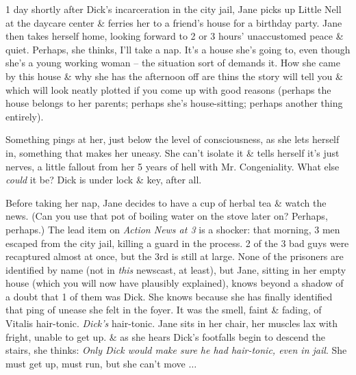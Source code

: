 \documentclass{article}
\numberwithin{equation}{section}
\begin{document}
1 day shortly after Dick's incarceration in the city jail, Jane picks up Little Nell at the daycare center \& ferries her to a friend's house for a birthday party. Jane then takes herself home, looking forward to 2 or 3 hours' unaccustomed peace \& quiet. Perhaps, she thinks, I'll take a nap. It's a house she's going to, even though she's a young working woman -- the situation sort of demands it. How she came by this house \& why she has the afternoon off are thins the story will tell you \& which will look neatly plotted if you come up with good reasons (perhaps the house belongs to her parents; perhaps she's house-sitting; perhaps another thing entirely).

Something pings at her, just below the level of consciousness, as she lets herself in, something that makes her uneasy. She can't isolate it \& tells herself it's just nerves, a little fallout from her 5 years of hell with Mr. Congeniality. What else \textit{could} it be? Dick is under lock \& key, after all.

Before taking her nap, Jane decides to have a cup of herbal tea \& watch the news. (Can you use that pot of boiling water on the stove later on? Perhaps, perhaps.) The lead item on \textit{Action News at 3} is a shocker: that morning, 3 men escaped from the city jail, killing a guard in the process. 2 of the 3 bad guys were recaptured almost at once, but the 3rd is still at large. None of the prisoners are identified by name (not in \textit{this} newscast, at least), but Jane, sitting in her empty house (which you will now have plausibly explained), knows beyond a shadow of a doubt that 1 of them was Dick. She knows because she has finally identified that ping of unease she felt in the foyer. It was the smell, faint \& fading, of Vitalis hair-tonic. \textit{Dick's} hair-tonic. Jane sits in her chair, her muscles lax with fright, unable to get up. \& as she hears Dick's footfalls begin to descend the stairs, she thinks: \textit{Only Dick would make sure he had hair-tonic, even in jail}. She must get up, must run, but she can't move $\ldots$
\end{document}
